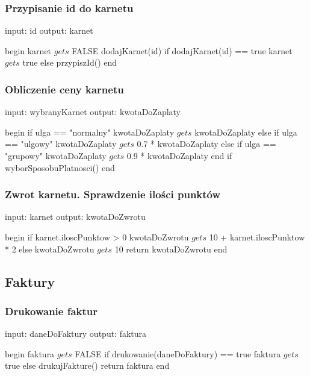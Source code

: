 \subsubsection{Przypisanie id do karnetu}
\begin{algorithm}[caption={1.1.3 Przypisanie id do karnetu}, label={alg1}]
  input: id
  output: karnet
  
begin
  karnet $gets$ FALSE
  dodajKarnet(id)
  if dodajKarnet(id) == true 
    karnet $gets$ true
  else
    przypiszId()
end
\end{algorithm}

\subsubsection{Obliczenie ceny karnetu}
\begin{algorithm}[caption={1.1.4 Obliczenie ceny karnetu}, label={alg1}]
input: wybranyKarnet
  output: kwotaDoZaplaty
  
begin
  if ulga == "normalny" 
    kwotaDoZaplaty $gets$ kwotaDoZaplaty
  else if ulga == "ulgowy" 
    kwotaDoZaplaty $gets$ 0.7 * kwotaDoZaplaty
else if ulga == "grupowy" 
    kwotaDoZaplaty $gets$ 0.9 * kwotaDoZaplaty
  end if
  wyborSposobuPlatnosci()
end
\end{algorithm}

\subsubsection{Zwrot karnetu. Sprawdzenie ilości punktów}
\begin{algorithm}[caption={2.1.1 Zwrot karnetu.Sprawdzenie ilości punktów}, label={alg1}]
  input: karnet
  output: kwotaDoZwrotu
  
begin
  if karnet.iloscPunktow > 0 
    kwotaDoZwrotu $gets$ 10 + karnet.iloscPunktow * 2
  else 
    kwotaDoZwrotu $gets$ 10
  return kwotaDoZwrotu
end
\end{algorithm}

\subsection{Faktury}
\subsubsection{Drukowanie faktur}
\begin{algorithm}[caption={2.2 Drukowanie faktur}, label={alg1}]
  input: daneDoFaktury
  output: faktura
  
begin
  faktura $gets$ FALSE
  if drukowanie(daneDoFaktury) == true 
    faktura $gets$ true
  else
    drukujFakture()
  return faktura
end
\end{algorithm}

